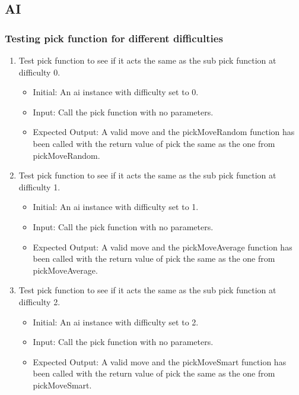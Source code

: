 \documentclass[12pt, titlepage]{article}
\begin{document}
\subsection{AI}
\subsubsection {Testing pick function for different difficulties}
\begin{enumerate}
	\item Test pick function to see if it acts the same as the sub pick function at difficulty 0. \begin{itemize}
		      \item Initial: An ai instance with difficulty set to 0.
		      \item Input: Call the pick function with no parameters.
		      \item Expected Output: A valid move and the pickMoveRandom function has been called with the return value of pick the same as the one from pickMoveRandom.
	      \end{itemize}
	\item Test pick function to see if it acts the same as the sub pick function at difficulty 1. \begin{itemize}
		      \item Initial: An ai instance with difficulty set to 1.
		      \item Input: Call the pick function with no parameters.
		      \item Expected Output: A valid move and the pickMoveAverage function has been called with the return value of pick the same as the one from pickMoveAverage.
	      \end{itemize}
	\item Test pick function to see if it acts the same as the sub pick function at difficulty 2. \begin{itemize}
		      \item Initial: An ai instance with difficulty set to 2.
		      \item Input: Call the pick function with no parameters.
		      \item Expected Output: A valid move and the pickMoveSmart function has been called with the return value of pick the same as the one from pickMoveSmart.
	      \end{itemize}
\end{enumerate}
\end{document}

